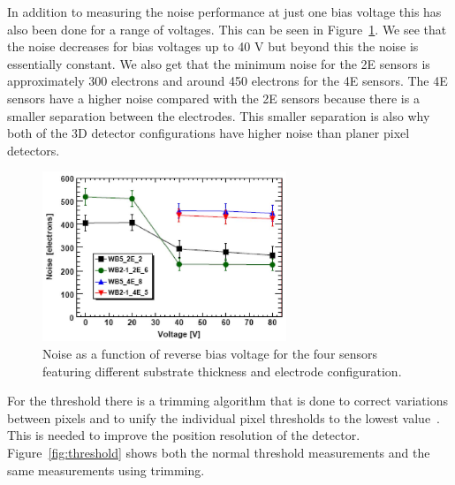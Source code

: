 In addition to measuring the noise performance at just one bias voltage this has also been done for a range of voltages.  This can be seen in Figure~\ref{fig:bias}. We see that the noise decreases for bias voltages up to 40 V but beyond this the noise is essentially constant. We also get that the minimum noise for the 2E sensors is approximately 300 electrons and around 450 electrons for the 4E sensors. The 4E sensors have a higher noise compared with the 2E sensors because there is a smaller separation between the electrodes.  This smaller separation is also why both of the 3D detector configurations have higher noise than planer pixel detectors.



\begin{figure}[htb!]
\begin{center}
\centerline{
\includegraphics[width=0.65\textwidth]{3D/bias.pdf}
}
\caption{Noise as a function of reverse bias voltage for the four sensors featuring different substrate thickness and electrode configuration.~\cite{5734879} }
\label{fig:bias}
\end{center}
\end{figure}

For the threshold there is a trimming algorithm that is done to correct variations between pixels and to unify the individual pixel thresholds to the lowest value~\cite{5734879}.  This is needed to improve the position resolution of the detector. Figure~\ref{fig:threshold} shows both the normal threshold measurements and the same measurements using trimming.


